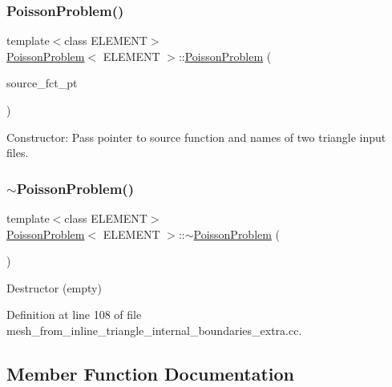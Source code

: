 \subsubsection{\texorpdfstring{Poisson\+Problem()}{PoissonProblem()}\hspace{0.1cm}{\footnotesize\ttfamily [2/2]}}
{\footnotesize\ttfamily template$<$class E\+L\+E\+M\+E\+NT$>$ \\
\hyperlink{classPoissonProblem}{Poisson\+Problem}$<$ E\+L\+E\+M\+E\+NT $>$\+::\hyperlink{classPoissonProblem}{Poisson\+Problem} (\begin{DoxyParamCaption}\item[{Poisson\+Equations$<$ 2 $>$\+::Poisson\+Source\+Fct\+Pt}]{source\+\_\+fct\+\_\+pt }\end{DoxyParamCaption})}



Constructor\+: Pass pointer to source function and names of two triangle input files. 

\mbox{\label{classPoissonProblem_ac247e42d2d292200617f4b9db7ed1ab8}} 
\subsubsection{\texorpdfstring{$\sim$\+Poisson\+Problem()}{~PoissonProblem()}\hspace{0.1cm}{\footnotesize\ttfamily [2/2]}}
{\footnotesize\ttfamily template$<$class E\+L\+E\+M\+E\+NT$>$ \\
\hyperlink{classPoissonProblem}{Poisson\+Problem}$<$ E\+L\+E\+M\+E\+NT $>$\+::$\sim$\hyperlink{classPoissonProblem}{Poisson\+Problem} (\begin{DoxyParamCaption}{ }\end{DoxyParamCaption})\hspace{0.3cm}{\ttfamily [inline]}}



Destructor (empty) 



Definition at line 108 of file mesh\+\_\+from\+\_\+inline\+\_\+triangle\+\_\+internal\+\_\+boundaries\+\_\+extra.\+cc.



\subsection{Member Function Documentation}
\mbox{\label{classPoissonProblem_a7a9478d8e1e5c7d3a886b00ab7d50bbd}} 
